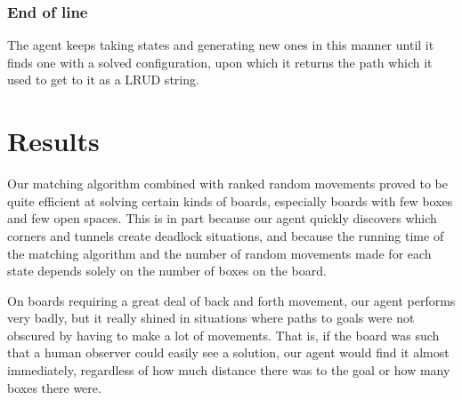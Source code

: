 \documentclass[article,11pt]{article}
\begin{document}
\subsubsection{End of line}
The agent keeps taking states and generating new ones in this manner
until it finds one with a solved configuration, upon which it returns
the path which it used to get to it as a LRUD string.

\section{Results}
Our matching algorithm combined with ranked random movements proved to
be quite efficient at solving certain kinds of boards, especially
boards with few boxes and few open spaces. This is in part because our
agent quickly discovers which corners and tunnels create deadlock
situations, and because the running time of the matching algorithm and
the number of random movements made for each state depends solely on
the number of boxes on the board. 

On boards requiring a great deal of back and forth movement, our agent
performs very badly, but it really shined in situations where paths to
goals were not obscured by having to make a lot of movements. That is,
if the board was such that a human observer could easily see a
solution, our agent would find it almost immediately, regardless of
how much distance there was to the goal or how many boxes there were. 
\end{document}
